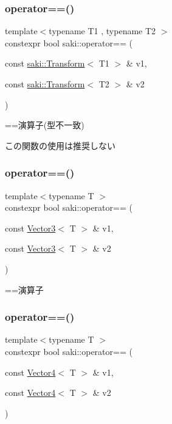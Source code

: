 \subsubsection{\texorpdfstring{operator==()}{operator==()}\hspace{0.1cm}{\footnotesize\ttfamily [3/11]}}
{\footnotesize\ttfamily template$<$typename T1 , typename T2 $>$ \\
constexpr bool saki\+::operator== (\begin{DoxyParamCaption}\item[{const \mbox{\hyperlink{classsaki_1_1_transform}{saki\+::\+Transform}}$<$ T1 $>$ \&}]{v1,  }\item[{const \mbox{\hyperlink{classsaki_1_1_transform}{saki\+::\+Transform}}$<$ T2 $>$ \&}]{v2 }\end{DoxyParamCaption})}



==演算子(型不一致) 

この関数の使用は推奨しない \mbox{\label{namespacesaki_a29747cf04c5a821834f7a1fea39e4050}} 
\subsubsection{\texorpdfstring{operator==()}{operator==()}\hspace{0.1cm}{\footnotesize\ttfamily [4/11]}}
{\footnotesize\ttfamily template$<$typename T $>$ \\
constexpr bool saki\+::operator== (\begin{DoxyParamCaption}\item[{const \mbox{\hyperlink{classsaki_1_1_vector3}{Vector3}}$<$ T $>$ \&}]{v1,  }\item[{const \mbox{\hyperlink{classsaki_1_1_vector3}{Vector3}}$<$ T $>$ \&}]{v2 }\end{DoxyParamCaption})}



==演算子 

\mbox{\label{namespacesaki_ab4626967b917017c2acf6ad76789db6c}} 
\subsubsection{\texorpdfstring{operator==()}{operator==()}\hspace{0.1cm}{\footnotesize\ttfamily [5/11]}}
{\footnotesize\ttfamily template$<$typename T $>$ \\
constexpr bool saki\+::operator== (\begin{DoxyParamCaption}\item[{const \mbox{\hyperlink{classsaki_1_1_vector4}{Vector4}}$<$ T $>$ \&}]{v1,  }\item[{const \mbox{\hyperlink{classsaki_1_1_vector4}{Vector4}}$<$ T $>$ \&}]{v2 }\end{DoxyParamCaption})}



